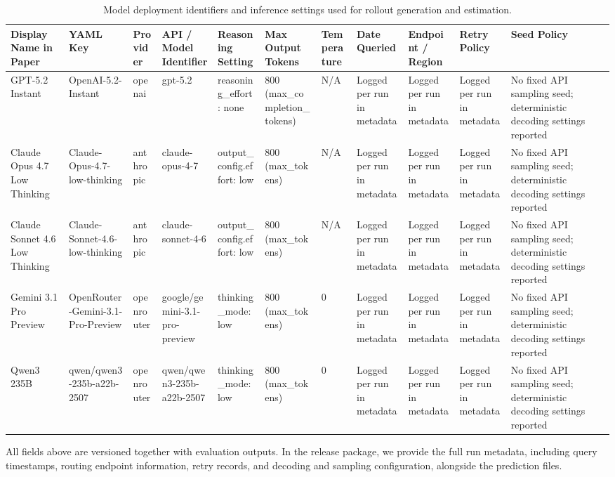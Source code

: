 \begin{table}[t]
\centering
\scriptsize
\setlength{\tabcolsep}{1pt}
\renewcommand{\arraystretch}{1.1}
\begin{tabular}{|p{}|p{}|p{}|p{}|p{}|p{}|p{}|p{}|p{}|p{}|p{}|}
\hline
Display Name in Paper & YAML Key & Provider & API / Model Identifier & Reasoning Setting & Max Output Tokens & Temperature & Date Queried & Endpoint / Region & Retry Policy & Seed Policy \\
\hline
GPT-5.2 Instant & OpenAI-5.2-Instant & openai & gpt-5.2 & reasoning\_effort: none & 800 (max\_completion\_tokens) & N/A & Logged per run in metadata & Logged per run in metadata & Logged per run in metadata & No fixed API sampling seed; deterministic decoding settings reported \\
\hline
Claude Opus 4.7 Low Thinking & Claude-Opus-4.7-low-thinking & anthropic & claude-opus-4-7 & output\_config.effort: low & 800 (max\_tokens) & N/A & Logged per run in metadata & Logged per run in metadata & Logged per run in metadata & No fixed API sampling seed; deterministic decoding settings reported \\
\hline
Claude Sonnet 4.6 Low Thinking & Claude-Sonnet-4.6-low-thinking & anthropic & claude-sonnet-4-6 & output\_config.effort: low & 800 (max\_tokens) & N/A & Logged per run in metadata & Logged per run in metadata & Logged per run in metadata & No fixed API sampling seed; deterministic decoding settings reported \\
\hline
Gemini 3.1 Pro Preview & OpenRouter-Gemini-3.1-Pro-Preview & openrouter & google/gemini-3.1-pro-preview & thinking\_mode: low & 800 (max\_tokens) & 0 & Logged per run in metadata & Logged per run in metadata & Logged per run in metadata & No fixed API sampling seed; deterministic decoding settings reported \\
\hline
Qwen3 235B & qwen/qwen3-235b-a22b-2507 & openrouter & qwen/qwen3-235b-a22b-2507 & thinking\_mode: low & 800 (max\_tokens) & 0 & Logged per run in metadata & Logged per run in metadata & Logged per run in metadata & No fixed API sampling seed; deterministic decoding settings reported \\
\hline
\end{tabular}
\caption{Model deployment identifiers and inference settings used for rollout generation and estimation.}
\label{tab:model-identifiers}
\end{table}

All fields above are versioned together with evaluation outputs. In the release package, we provide the full run metadata, including query timestamps, routing endpoint information, retry records, and decoding and sampling configuration, alongside the prediction files.
